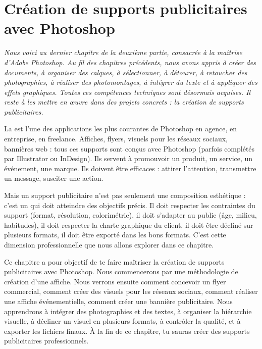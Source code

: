 
\chapter{Création de supports publicitaires avec Photoshop}

\noindent
\textit{Nous voici au dernier chapitre de la deuxième partie, consacrée à la maîtrise d'Adobe Photoshop. Au fil des chapitres précédents, nous avons appris à créer des documents, à organiser des calques, à sélectionner, à détourer, à retoucher des photographies, à réaliser des photomontages, à intégrer du texte et à appliquer des effets graphiques. Toutes ces compétences techniques sont désormais acquises. Il reste à les mettre en œuvre dans des projets concrets : la création de supports publicitaires.}

\vspace{1em}

\noindent
La  est l'une des applications les plus courantes de Photoshop en agence, en entreprise, en freelance. Affiches, flyers, visuels pour les réseaux sociaux, bannières web : tous ces supports sont conçus avec Photoshop (parfois complétés par Illustrator ou InDesign). Ils servent à promouvoir un produit, un service, un événement, une marque. Ils doivent être efficaces : attirer l'attention, transmettre un message, susciter une action.

\vspace{1em}

\noindent
Mais un support publicitaire n'est pas seulement une composition esthétique : c'est un  qui doit atteindre des objectifs précis. Il doit respecter les contraintes du support (format, résolution, colorimétrie), il doit s'adapter au public (âge, milieu, habitudes), il doit respecter la charte graphique du client, il doit être décliné sur plusieurs formats, il doit être exporté dans les bons formats. C'est cette dimension professionnelle que nous allons explorer dans ce chapitre.

\vspace{1em}

\noindent
Ce chapitre a pour objectif de te faire maîtriser la création de supports publicitaires avec Photoshop. Nous commencerons par une méthodologie de création d'une affiche. Nous verrons ensuite comment concevoir un flyer commercial, comment créer des visuels pour les réseaux sociaux, comment réaliser une affiche événementielle, comment créer une bannière publicitaire. Nous apprendrons à intégrer des photographies et des textes, à organiser la hiérarchie visuelle, à décliner un visuel en plusieurs formats, à contrôler la qualité, et à exporter les fichiers finaux. À la fin de ce chapitre, tu sauras créer des supports publicitaires professionnels.

